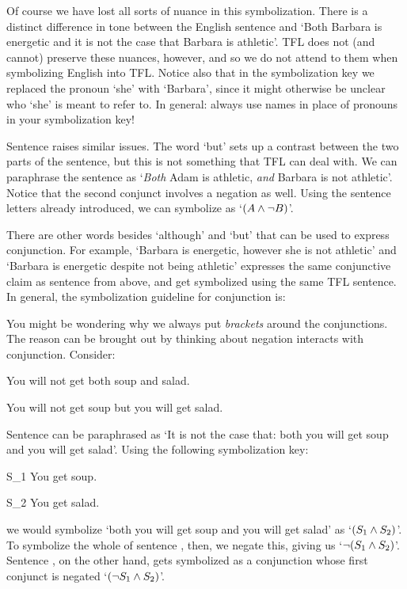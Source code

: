 Of course we have lost all sorts of nuance in this symbolization. There is a distinct difference in tone between the English sentence  and `Both Barbara is energetic and it is not the case that Barbara is athletic'. TFL does not (and cannot) preserve these nuances, however, and so we do not attend to them when symbolizing English into TFL.  Notice also that in the symbolization key we replaced the pronoun `she' with `Barbara', since it might otherwise be unclear who `she' is meant to refer to.  In general: always use names in place of pronouns in your symbolization key!


Sentence  raises similar issues. The word `but' sets up a contrast between the two parts of the sentence, but this is not something that TFL can deal with. We can paraphrase the sentence as `\emph{Both} Adam is athletic, \emph{and} Barbara is not athletic'.  Notice that the second conjunct involves a negation as well.  Using the sentence letters already introduced, we can symbolize  as `$(A \wedge \neg B)$'. 


There are other words besides `although' and `but' that can be used to express conjunction.  For example, `Barbara is energetic, however she is not athletic' and `Barbara is energetic despite not being athletic' expresses the same conjunctive claim as sentence  from above, and get symbolized using the same TFL sentence. In general, the symbolization guideline for conjunction is:


You might be wondering why we always put \emph{brackets} around the conjunctions. The reason can be brought out by thinking about negation interacts with conjunction. Consider:

	\begin{earg}
		\item[\ex{negcon1}] You will not get both soup and salad.
		\item[\ex{negcon2}] You will not get soup but you will get salad.
	\end{earg}
	
Sentence  can be paraphrased as `It is not the case that: both you will get soup and you will get salad'. Using the following symbolization key:
	\begin{ekey}
		\item[S_1] You get soup.
		\item[S_2] You get salad.
	\end{ekey}
we would symbolize `both you will get soup and you will get salad' as `$(S_1 \wedge S_2)$'. To symbolize the whole of sentence , then, we negate this, giving us `$\neg (S_1 \wedge S_2)$'. Sentence , on the other hand, gets symbolized as a conjunction whose first conjunct is negated `$(\neg S_1 \wedge S_2)$'.  

